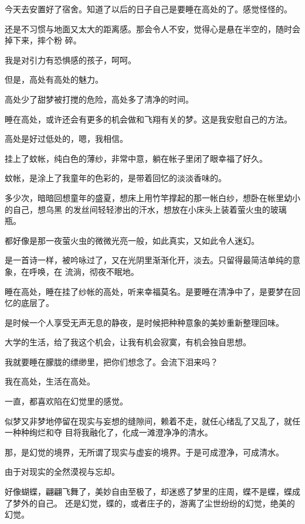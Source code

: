 	\endwriting



		今天去安置好了宿舍。知道了以后的日子自己是要睡在高处的了。感觉怪怪的。

		还是不习惯与地面又太大的距离感。那会令人不安，觉得心是悬在半空的，随时会掉下来，摔个粉
	碎。

		我是对引力有恐惧感的孩子，呵呵。

		但是，高处有高处的魅力。

		高处少了甜梦被打搅的危险，高处多了清净的时间。

		睡在高处，或许还会有更多的机会做和飞翔有关的梦。这是我安慰自己的方法。

		高处是好过低处的，嗯，我相信。

		挂上了蚊帐，纯白色的薄纱，非常中意，躺在帐子里闭了眼幸福了好久。

		蚊帐，是涂上了我童年的色彩的，是带着回忆的淡淡香味的。

		多少次，暗暗回想童年的盛夏，想床上用竹竿撑起的那一帐白纱，想卧在帐里幼小的自己，想乌黑
	的发丝间轻轻渗出的汗水，想放在小床头上装着萤火虫的玻璃瓶。

		都好像是那一夜萤火虫的微微光亮一般，如此真实，又如此令人迷幻。

		是一首诗一样，被吟咏过了，又在光阴里渐渐化开，淡去。只留得最简洁单纯的意象，在呼唤，在
	流淌，彻夜不眠地。

		睡在高处，睡在挂了纱帐的高处，听来幸福莫名。是要睡在清净中了，是要梦在回忆的底层了。

		是时候一个人享受无声无息的静夜，是时候把种种意象的美妙重新整理回味。

		大学的生活，给了我这个机会，让我有机会寂寞，有机会独自思想。

		我就要睡在朦胧的缥缈里，把你们想念了。会流下泪来吗？

		我在高处，生活在高处。

	\endwriting



		一直，都喜欢陷在幻觉里的感觉。

		似梦又非梦地停留在现实与妄想的缝隙间，赖着不走，就任心绪乱了又乱了，就任一种种绚烂和夺
	目将我融化了，化成一滩澄净净的清水。

		那，是幻觉的境界，无所谓了现实与虚妄的境界。于是可成澄净，可成清水。

		由于对现实的全然漠视与忘却。

		好像蝴蝶，翩翩飞舞了，美妙自由至极了，却迷惑了梦里的庄周，蝶不是蝶，蝶成了梦外的自己。
	还是幻觉，蝶的，或者庄子的，游离了尘世纷纷的幻觉，绝美的幻觉。

